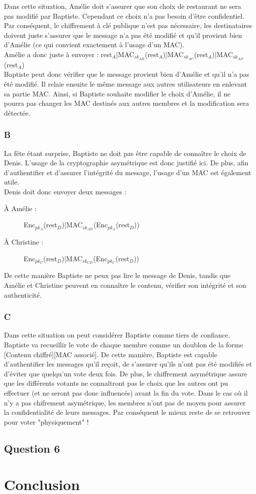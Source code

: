 \documentclass[a4paper, 11pt, oneside]{article}
\begin{document}
Dans cette situation, Amélie doit s'assurer que son choix de restaurant ne sera pas modifié par Baptiste. Cependant ce choix n'a pas besoin d'être confidentiel.
Par conséquent, le chiffrement à clé publique n'est pas nécessaire, les destinataires doivent juste s'assurer que le message n'a pas été modifié et qu'il provient bien d'Amélie (ce qui convient exactement à l'usage d'un MAC).\\[5pt]
Amélie a donc juste à envoyer : rest$_{A}$|MAC$_{sk_{AB}}$(rest$_{A}$)|MAC$_{sk_{AC}}$(rest$_{A}$)|MAC$_{sk_{AD}}$(rest$_{A}$)\\[5pt]
Baptiste peut donc vérifier que le message provient bien d'Amélie et qu'il n'a pas été modifié. Il relaie ensuite le même message aux autres utilisateurs en enlevant sa partie MAC.
Ainsi, si Baptiste souhaite modifier le choix d'Amélie, il ne pourra pas changer les MAC destinés aux autres membres et la modification sera détectée.

\subsubsection{B}

La fête étant surprise, Baptiste ne doit pas être capable de connaître le choix de Denis. L'usage de la cryptographie asymétrique est donc justifié ici. De plus, afin d'authentifier et d'assurer l'intégrité du message, l'usage d'un MAC est également utile.\\[5pt]
Denis doit donc envoyer deux messages : 

\begin{description}
 \item[À Amélie : ] Enc$_{pk_{A}}$(rest$_{D}$)|MAC$_{sk_{AD}}$(Enc$_{pk_{A}}$(rest$_{D}$))
 \item[À Christine : ] Enc$_{pk_{C}}$(rest$_{D}$)|MAC$_{sk_{CD}}$(Enc$_{pk_{C}}$(rest$_{D}$))
\end{description}
\vspace{5pt}

De cette manière Baptiste ne peux pas lire le message de Denis, tandis que Amélie et Christine peuvent en connaître le contenu, vérifier son intégrité et son authenticité.

\subsubsection{C}

Dans cette situation on peut considérer Baptiste comme tiers de confiance. Baptiste va recueillir le vote de chaque membre comme un doublon de la forme [Contenu chiffré][MAC associé]. De cette manière, Baptiste est capable d'authentifier les messages qu'il reçoit, de s'assurer qu'ils n'ont pas été modifiés et d'éviter que quelqu'un vote deux fois. De plus, le chiffrement asymétrique assure que les différents votants ne connaîtront pas le choix que les autres ont pu effectuer (et ne seront pas donc influencés) avant la fin du vote.
Dans le cas où il n'y a pas chifrement asymétrique, les membres n'ont pas de moyen pour assurer la confidentialité de leurs messages. Par conséquent le mieux reste de se retrouver pour voter "physiquement" !

\subsection{Question 6}

\section*{Conclusion}
\end{document}
